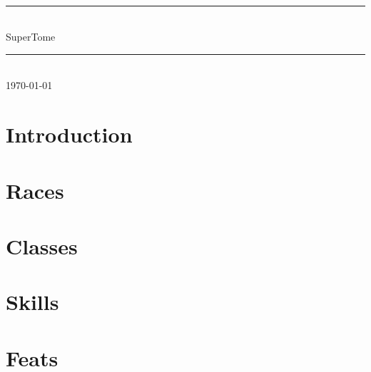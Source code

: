 \documentclass[12pt,oneside,onecolumn,openany,final]{memoir}
\begin{document}
\thispagestyle{empty}
\begin{center}
\textsc{\Large}\\[0.25cm]
\rule{\linewidth}{0.5mm} \\[0.7cm]
\fontsize{30}{30} \selectfont SuperTome\\%
\rule{\linewidth}{0.5mm} \\[0.7cm]
\vfill
\normalsize{\today}
\end{center}

\pagebreak
\sffamily
\pagestyle{plain}
\raggedbottom

\renewcommand{\contentsname}{Table of Contents}
\setcounter{tocdepth}{1}
\small{\tableofcontents}


\clearpage{}
\chapter{Introduction}
\clearpage{}
\chapter{Races}
\clearpage{}
\chapter{Classes}
\clearpage{}
\chapter{Skills}
\clearpage{}
\chapter{Feats}
\clearpage{}
\end{document}
